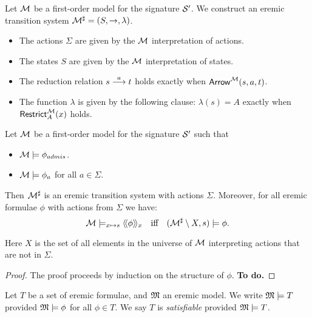 \begin{definition}
Let $\mathcal{M}$ be a first-order model for the signature $\mathcal{S}'$.
We construct an eremic transition system
$\mathcal{M}^{\sharp} = (S, \rightarrow, \lambda)$.
\begin{itemize}

\item The actions $\Sigma$ are given by the $\mathcal{M}$ interpretation of actions.

\item The states $S$ are given by the $\mathcal{M}$ interpretation of states.

\item The reduction relation $s \stackrel{a}{\longrightarrow} t$ holds exactly when
  $\mathsf{Arrow}^{\mathcal{M}}(s, a, t)$.

\item The function $\lambda$ is given by the following clause:
  $\lambda(s) = A$ exactly when $\mathsf{Restrict}_{A}^{\mathcal{M}}(x)$
  holds.

\end{itemize}

\end{definition}

\begin{theorem}\label{correspondence:theorem:223}
Let $\mathcal{M}$ be a first-order model for the signature $\mathcal{S}'$ such that
\begin{itemize}

\item $\mathcal{M} \models \phi_{admis}$.
 
\item $\mathcal{M} \models \phi_{a}$ for all $a \in \Sigma$.

\end{itemize}

\NI Then $\mathcal{M}^{\sharp}$ is an eremic transition system with
actions $\Sigma$. Moreover, for all eremic formulae $\phi$ with
actions from $\Sigma$ we have:
\[
   \mathcal{M} \models_{x \mapsto s} \langle\!\langle \phi \rangle\!\rangle_x 
        \quad  \text{iff} \quad 
   (\mathcal{M}^{\sharp} \setminus X, s) \models \phi.
\]
\end{theorem}
Here $X$ is the set of all elements in the universe of $\mathcal{M}$ interpreting
actions that are not in $\Sigma$.
\begin{proof}
The proof proceeds by induction on the structure of $\phi$. \textbf{To do.}
\end{proof}

\begin{definition}
Let $T$ be a set of eremic formulae, and $\frak{M}$ an eremic model.  We
write $\frak{M} \models T$ provided $\frak{M} \models \phi$ for all $\phi \in
T$.  We say $T$ is \emph{satisfiable} provided $\frak{M} \models T$.
\end{definition}

